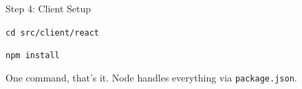 \documentclass[aspectratio=169]{beamer}
\begin{document}
\begin{frame}{Step 4: Client Setup}
\begin{center}
\LARGE \texttt{cd src/client/react}
\end{center}

\vspace{0.3cm}

\begin{center}
\LARGE \texttt{npm install}
\end{center}

\vspace{0.5cm}

\begin{block}{One command, that's it.}
Node handles everything via \texttt{package.json}.
\end{block}
\end{frame}
\end{document}
